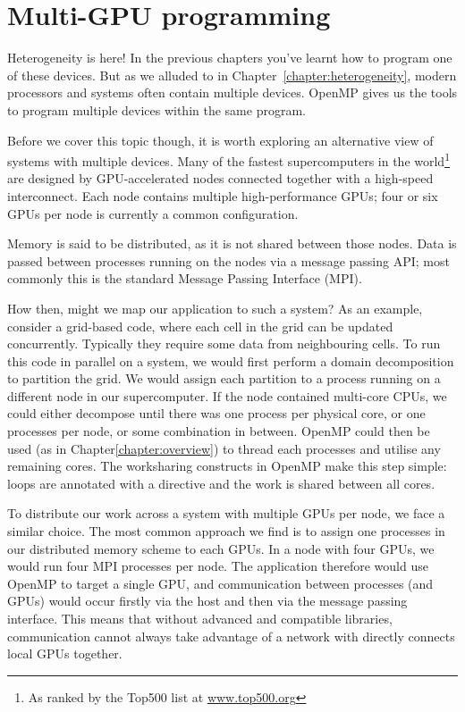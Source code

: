 
\def\ArtDir{06.MultiGPU/figures}

\chapter{Multi-GPU programming}
\label{chapter:multi_gpu}

Heterogeneity is here! In the previous chapters you've learnt how to program one
of these devices. But as we alluded to in Chapter~\ref{chapter:heterogeneity},
modern processors and systems often contain multiple devices. OpenMP gives us
the tools to program multiple devices within the same program.

Before we cover this topic though, it is worth exploring an alternative view of
systems with multiple devices. Many of the fastest supercomputers in the
world\footnote{As ranked by the Top500 list at \url{www.top500.org}} are
designed by GPU-accelerated nodes connected together with a high-speed
interconnect. Each node contains multiple high-performance GPUs; four or six
GPUs per node is currently a common configuration.

Memory is said to be distributed, as it is not shared between those nodes. Data
is passed between processes running on the nodes via a message passing API;
most commonly this is the standard Message Passing Interface (MPI).

How then, might we map our application to such a system? As an example, consider
a grid-based code, where each cell in the grid can be updated concurrently.
Typically they require some data from neighbouring cells.
To run this code in parallel on a system, we would first perform a domain
decomposition to partition the grid. We would assign each partition to a process
running on a different node in our supercomputer. If the node contained
multi-core CPUs, we could either decompose until there was one process per
physical core, or one processes per node, or some combination in between.
OpenMP could then be used (as in Chapter\ref{chapter:overview}) to thread each
processes and utilise any remaining cores. The worksharing constructs in OpenMP
make this step simple: loops are annotated with a  directive
and the work is shared between all cores.

To distribute our work across a system with multiple GPUs per node, we face a
similar choice. The most common approach we find is to assign one processes in
our distributed memory scheme to each GPUs. In a node with four GPUs, we would
run four MPI processes per node. The application therefore would use OpenMP to
target a single GPU, and communication between processes (and GPUs) would occur
firstly via the host and then via the message passing interface. This means that
without advanced and compatible libraries, communication cannot always take
advantage of a network with directly connects local GPUs together.

